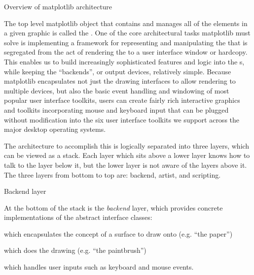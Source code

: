 \begin{aosasect1}{Overview of matplotlib architecture}

The top level matplotlib object that contains and manages all of the
elements in a given graphic is called the .  One of the
core architectural tasks matplotlib must solve is implementing a
framework for representing and manipulating the  that
is segregated from the act of rendering the  to a user
interface window or hardcopy.  This enables us to build increasingly
sophisticated features and logic into the s, while
keeping the ``backends'', or output devices, relatively simple.
Because matplotlib encapsulates not just the drawing interfaces to
allow rendering to multiple devices, but also the basic event
handling and windowing of most popular user interface toolkits,
users can create fairly rich interactive graphics and toolkits
incorporating mouse and keyboard input that can be plugged without
modification into the six user interface toolkits we support across
the major desktop operating systems.

The architecture to accomplish this is logically separated into three
layers, which can be viewed as a stack.  Each layer which sits above a
lower layer knows how to talk to the layer below it, but the lower
layer is not aware of the layers above it.  The three layers from
bottom to top are: backend, artist, and scripting.


\begin{aosasect2}{Backend layer}

At the bottom of the stack is the \emph{backend} layer, which provides
concrete implementations of the abstract interface classes:
\begin{aosaitemize}
\item {} which encapsulates the concept of
  a surface to draw onto (e.g. ``the paper'')

\item {} which does the drawing (e.g. ``the paintbrush'')

\item {} which handles user inputs such as keyboard and
  mouse events.
\end{aosaitemize}


\end{aosasect2}
\end{aosasect1}
